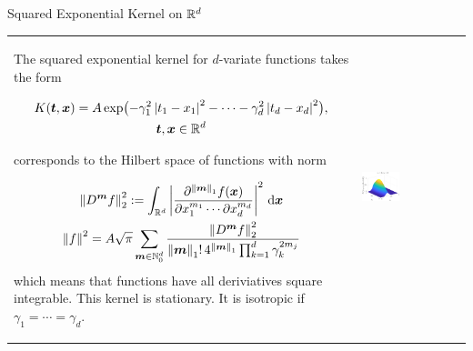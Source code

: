 \documentclass[10pt,compress,xcolor={usenames,dvipsnames},aspectratio=169]{beamer}
\begin{document}
\begin{frame}{Squared Exponential Kernel on $\reals^d$}
	
\vspace{-4ex}
\begin{tabular}{m{}m{}}
	The squared exponential kernel for $d$-variate functions takes the form 
	
	\vspace{-4ex}
	\begin{multline*}
	K(\vt,\vx) = A \exp\bigl(-\gamma_1^2\abs{t_1-x_1}^2 - \cdots - \gamma_d^2\abs{t_d-x_d}^2 \bigr) , \\
	 \vt, \vx \in \reals^d
	\end{multline*}

	\vspace{-1ex}
	corresponds to the Hilbert space of functions with norm

	\vspace{-4ex}
	\begin{gather*}
		\norm[2]{D^{\vm} f}^2 := \int_{\reals^d} \abs{\frac{\partial^{\norm[1]{\vm}}f(\vx)}{\partial x_1^{m_1} \cdots \partial x_d^{m_d}}}^2 \, \dif \vx \\
		\norm{f}^2 =  A\sqrt{\pi}  \sum_{\vm \in \natzero^d} \frac{\norm[2]{D^{\vm} f}^2}{\norm[1]{\vm}! \, 4^{\norm[1]{\vm}} \prod_{k=1}^d \gamma_k^{2m_j}}
	\end{gather*}
	which means that functions have all deriviatives square integrable.  This kernel is \alert{stationary}.  It is \alert{isotropic} if  $\gamma_1 = \cdots = \gamma_d$.
	&
	\includegraphics[width=0.38\textwidth]{RK2-sqexpker.eps}
\end{tabular}

\end{frame}
\end{document}

